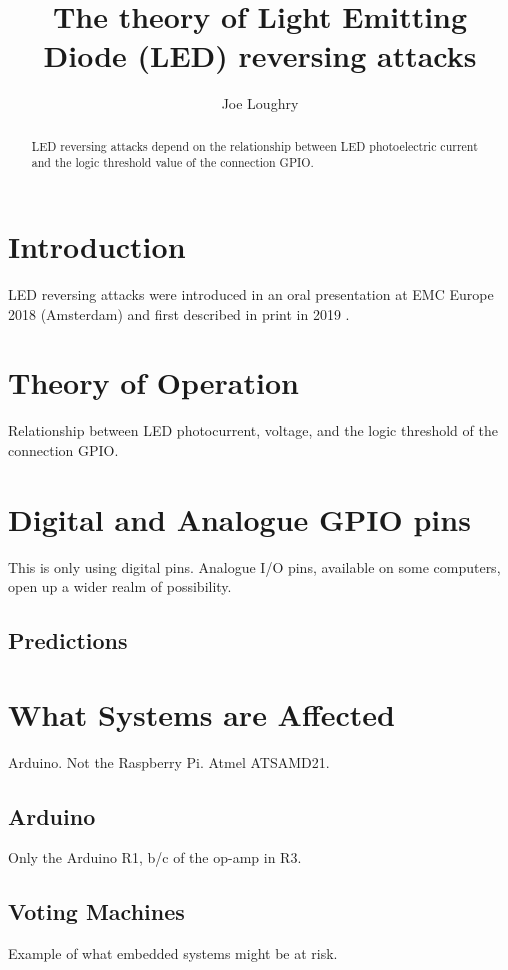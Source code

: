 \documentclass[a4paper,notitlepage]{article}
\begin{document}
\title{The theory of Light Emitting Diode (LED) reversing attacks}
\author{Joe Loughry}
\maketitle
\begin{abstract}
  LED reversing attacks depend on the relationship between LED photoelectric
  current and the logic threshold value of the connection GPIO.
\end{abstract}
\maketitle
\section{Introduction}
LED reversing attacks were introduced in an oral presentation at EMC Europe
2018 (Amsterdam) and first described in print in 2019 \cite{Loughry2019}.
\section{Theory of Operation}
Relationship between LED photocurrent, voltage, and the logic threshold of the
connection GPIO.
\section{Digital and Analogue GPIO pins}
This is only using digital pins. Analogue I/O pins, available on some
computers, open up a wider realm of possibility.
\subsection{Predictions}
\section{What Systems are Affected}
Arduino. Not the Raspberry Pi. Atmel ATSAMD21.
\subsection{Arduino}
Only the Arduino R1, b/c of the op-amp in R3.
\subsection{Voting Machines}
Example of what embedded systems might be at risk.


\appendix
\end{document}
